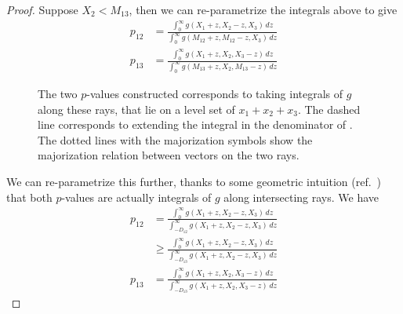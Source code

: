 \documentclass[11pt]{article}
\begin{document}
\begin{proof}
Suppose $X_2 < M_{13}$, then we can re-parametrize the integrals above to give
\begin{align*}
p_{12} & = \frac{\int_0^\infty g\left(X_1 + z, X_2 - z, X_3\right) \,dz}{\int_0^\infty g\left(M_{12} + z, M_{12} - z, X_3\right) \,dz} \\
p_{13} & = \frac{\int_0^\infty g\left(X_1 + z, X_2, X_3 - z\right) \,dz}{\int_0^\infty g\left(M_{13} + z, X_2, M_{13} - z\right) \,dz}
\end{align*}

\begin{figure}[htbp]
\begin{center}
\end{center}
\caption{The two $p$-values constructed corresponds to taking integrals of $g$ along these rays, that lie on a level set of $x_1 + x_2 + x_3$. The dashed line corresponds to extending the integral in the denominator of . The dotted lines with the majorization symbols show the majorization relation between vectors on the two rays.}
\label{fig:rays}
\end{figure}

We can re-parametrize this further, thanks to some geometric intuition (ref.\ ) that both $p$-values are actually integrals of $g$ along intersecting rays. We have
\begin{align}
p_{12} & = \frac{\int_0^\infty g\left(X_1 + z, X_2 - z, X_3\right) \,dz}{\int_{-D_{12}}^\infty g\left(X_1 + z, X_2 - z, X_3\right) \,dz} \nonumber \\
& \ge \frac{\int_0^\infty g\left(X_1 + z, X_2 - z, X_3\right) \,dz}{\int_{-D_{13}}^\infty g\left(X_1 + z, X_2 - z, X_3\right) \,dz} \label{eqn:int_extension} \\
p_{13} & = \frac{\int_0^\infty g\left(X_1 + z, X_2, X_3 - z\right) \,dz}{\int_{-D_{13}}^\infty g\left(X_1 + z, X_2, X_3 - z\right) \,dz} \label{eqn:p13}
\end{align}


\end{proof}
\end{document}
